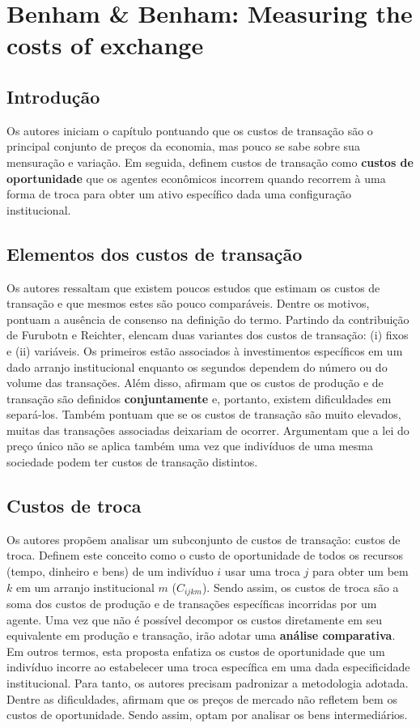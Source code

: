 \section*{Benham \& Benham: Measuring the costs of exchange}

\subsection*{Introdução}

Os autores iniciam o capítulo pontuando que os custos de transação são o principal conjunto de preços da economia, mas pouco se sabe sobre sua mensuração e variação.
Em seguida, definem custos de transação como \textbf{custos de oportunidade} que os agentes econômicos incorrem quando recorrem à uma forma de troca para obter um ativo específico dada uma configuração institucional.

\subsection*{Elementos dos custos de transação}

Os autores ressaltam que existem poucos estudos que estimam os custos de transação e que mesmos estes são pouco comparáveis. Dentre os motivos, pontuam a ausência de consenso na definição do termo. Partindo da contribuição de Furubotn e Reichter, elencam duas variantes dos custos de transação: (i) fixos e (ii) variáveis. Os primeiros estão associados à investimentos específicos em um dado arranjo institucional enquanto os segundos dependem do número ou do volume das transações.
Além disso, afirmam que os custos de produção e de transação são definidos \textbf{conjuntamente} e, portanto, existem dificuldades em separá-los. Também pontuam que se os custos de transação são muito elevados, muitas das transações associadas deixariam de ocorrer. Argumentam que a lei do preço único não se aplica também uma vez que indivíduos de uma mesma sociedade podem ter custos de transação distintos.

\subsection*{Custos de troca}

Os autores propõem analisar um subconjunto de custos de transação: custos de troca. Definem este conceito como o custo de oportunidade de todos os recursos (tempo, dinheiro e bens) de um indivíduo $i$ usar uma troca $j$ para obter um bem $k$ em um arranjo institucional $m$ ($C_{ijkm}$). Sendo assim, os custos de troca são a soma dos custos de produção e de transações específicas incorridas por um agente. Uma vez que não é possível decompor os custos diretamente em seu equivalente em produção e transação, irão adotar uma \textbf{análise comparativa}. Em outros termos, esta proposta enfatiza os custos de oportunidade que um indivíduo incorre ao estabelecer uma troca específica em uma dada especificidade institucional.
Para tanto, os autores precisam padronizar a metodologia adotada. Dentre as dificuldades, afirmam que os preços de mercado não refletem bem os custos de oportunidade. Sendo assim, optam por analisar os bens intermediários.


